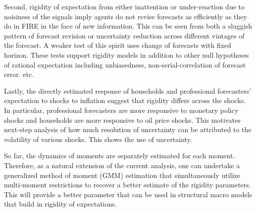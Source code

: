 \documentclass[]{article}
\begin{document}
	Second, rigidity of expectation from either inattention or under-reaction due to noisiness of the signals imply agents do not revise forecasts as efficiently as they do in FIRE in the face of new information. This can be seen from both a sluggish pattern of forecast revision or uncertainty reduction across different vintages of the forecast. A weaker test of this spirit uses change of forecasts with fixed horizon. These tests support rigidity models in addition to other null hypotheses of rational expectation including unbiasedness,  non-serial-correlation of forecast error. etc.
	
	Lastly, the directly estimated response of households and professional forecasters' expectation to shocks to inflation suggest that rigidity differs across the shocks. In particular, professional forecasters are more responsive to monetary policy shocks and households are more responsive to oil price shocks. This motivates next-step analysis of how much resolution of uncertainty can be attributed to the volatility of various shocks. This shows the use of uncertainty.
	
	So far, the dynamics of moments are separately estimated for each moment. Therefore, as a natural extension of the current analysis, one can  undertake a generalized method of moment (GMM) estimation that simultaneously utilize multi-moment restrictions to recover a better estimate of the rigidity parameters.  This will provide a better parameter that can be used in structural macro models that build in rigidity of expectations. 
	
	
	
	
\end{document}
